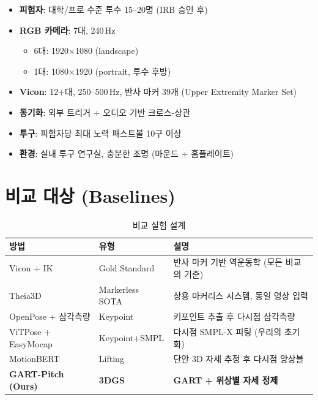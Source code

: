 \documentclass[11pt, a4paper]{report}
\begin{document}
\begin{setupbox}[title={실험 세팅}]
\begin{itemize}[leftmargin=*]
  \item \textbf{피험자}: 대학/프로 수준 투수 15--20명 (IRB 승인 후)
  \item \textbf{RGB 카메라}: 7대, 240\,Hz
  \begin{itemize}
    \item 6대: 1920$\times$1080 (landscape)
    \item 1대: 1080$\times$1920 (portrait, 투수 후방)
  \end{itemize}
  \item \textbf{Vicon}: 12+대, 250--500\,Hz, 반사 마커 39개 (Upper Extremity Marker Set)
  \item \textbf{동기화}: 외부 트리거 + 오디오 기반 크로스-상관
  \item \textbf{투구}: 피험자당 최대 노력 패스트볼 10구 이상
  \item \textbf{환경}: 실내 투구 연구실, 충분한 조명 (마운드 + 홈플레이트)
\end{itemize}
\end{setupbox}


\section{비교 대상 (Baselines)}

\begin{table}[H]
\centering
\caption{비교 실험 설계}
\label{tab:baselines}
\renewcommand{\arraystretch}{1.3}
\begin{tabular}{p{3.5cm}p{3cm}p{6cm}}
\toprule
\textbf{방법} & \textbf{유형} & \textbf{설명} \\
\midrule
Vicon + IK & Gold Standard & 반사 마커 기반 역운동학 (모든 비교의 기준) \\
\midrule
Theia3D & Markerless SOTA & 상용 마커리스 시스템, 동일 영상 입력 \\
OpenPose + 삼각측량 & Keypoint & 키포인트 추출 후 다시점 삼각측량 \\
ViTPose + EasyMocap & Keypoint+SMPL & 다시점 SMPL-X 피팅 (우리의 초기화) \\
MotionBERT & Lifting & 단안 3D 자세 추정 후 다시점 앙상블 \\
\textbf{GART-Pitch (Ours)} & \textbf{3DGS} & \textbf{GART + 위상별 자세 정제} \\
\bottomrule
\end{tabular}
\end{table}
\end{document}
